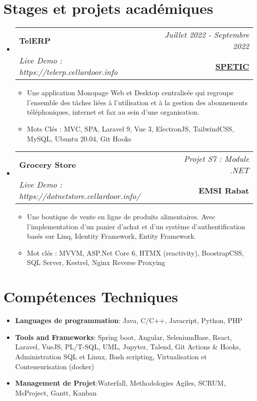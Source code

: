 \documentclass[a4paper,11pt]{article}
\makeatletter
\newcommand{\resumeItem}[2]{
  \item{
    \textbf{#1}{:\hspace{0.5mm}#2 \vspace{-0.5mm}}
  }
}
\newcommand{\resumeProject}[4]{
\vspace{0.5mm}\item
    \begin{tabular*}{0.98\textwidth}[t]{l@{\extracolsep{\fill}}r}
        \textbf{#1} & \textit{\footnotesize{#3}} \\
        \footnotesize{\textit{#2}} & \footnotesize{#4}
    \end{tabular*}
    \vspace{-2.4mm}
}
\newcommand{\resumeSubItem}[2]{\resumeItem{#1}{#2}\vspace{-4pt}}
\newcommand{\resumeSubHeadingListStart}{\begin{itemize}[leftmargin=*,labelsep=0mm]}
\newcommand{\resumeHeadingSkillStart}{\begin{itemize}[leftmargin=*,itemsep=1.7mm, rightmargin=2ex]}
\newcommand{\resumeItemListStart}{\begin{justify}\begin{itemize}[leftmargin=3ex, rightmargin=2ex, noitemsep,labelsep=1.2mm,itemsep=0mm]\small}
\newcommand{\resumeSubHeadingListEnd}{\end{itemize}\vspace{2mm}}
\newcommand{\resumeHeadingSkillEnd}{\end{itemize}\vspace{-2mm}}
\newcommand{\resumeItemListEnd}{\end{itemize}\end{justify}\vspace{-2mm}}
\makeatother
\begin{document}
\section{\textbf{Stages et projets académiques}}
\resumeSubHeadingListStart 
    \resumeProject
      {TelERP} 
      {Live Demo : https://telerp.cellardoor.info}
      {Juillet 2022 - Septembre 2022} 
      {\href{https://telerp.cellardoor.info}{\textbf{SPETIC}}}
        \vspace{-2mm}
      \resumeItemListStart
        \item {Une application Monopage Web et Desktop centralisée qui regroupe l'ensemble des tâches liées à l'utilisation et à la gestion des abonnements téléphoniques, internet et fax au sein d'une organisation.}
        \item {Mots Clés : MVC, SPA, Laravel 9, Vue 3, ElectronJS, TailwindCSS, MySQL, Ubuntu 20.04, Git Hooks}
      \resumeItemListEnd
      \vspace{-3mm}
    \resumeProject
      {Grocery Store} 
    {Live Demo : https://dotnetstore.cellardoor.info/}
      {Projet S7 : Module .NET} 
      {{\textbf{EMSI Rabat}}}
    \vspace{-2mm}
      \resumeItemListStart
        \item {Une boutique de vente en ligne de produits alimentaires. Avec l'implementation d'un panier d'achat et d'un système d'authentification basés sur Linq, Identity Framework, Entity Framework.}
        \item {Mot clés : MVVM, ASP.Net Core 6, HTMX (reactivity), BoostrapCSS, SQL Server, Kestrel, Nginx Reverse Proxying }
      \resumeItemListEnd
     \vspace{-2mm}
\resumeSubHeadingListEnd
\vspace{-7mm}

\section{\textbf{Compétences Techniques}}
 \resumeHeadingSkillStart
  \resumeSubItem{Languages de programmation} 
    { Java, C/C++, Javacript, Python, PHP}
    \vspace{-0.5mm} 
 \resumeSubItem{Tools and Frameworks} 
    { Spring boot, Angular, SeleniumBase, React, Laravel, VueJS, PL/T-SQL, UML, Jupyter, Talend, Git Actions \& Hooks, Administration SQL et Linux, Bash scripting, Virtualisation et Conteneurisation (docker)} 
    \vspace{-0.5mm} 
    \resumeSubItem{Management de Projet} 
    {Waterfall, Methodologies Agiles, SCRUM,  MsProject, Gantt, Kanban} 
    \vspace{-0.5mm} 
 \resumeHeadingSkillEnd
\vspace{-2mm}
\end{document}
